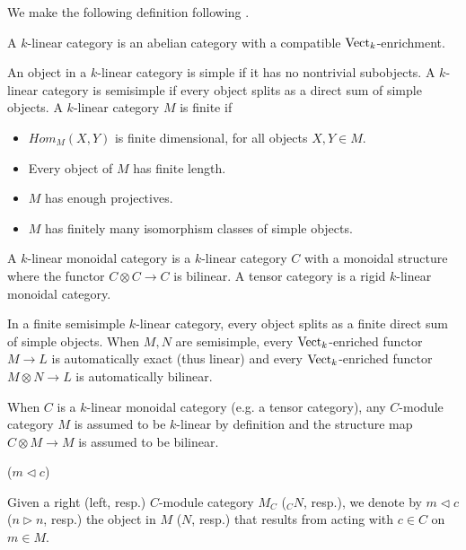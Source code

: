 \noindent We make the following definition following \cite{douglas/balanced-product}.

\begin{definition} A $k$-linear category is an abelian category with a compatible $\operatorname{Vect}_{k}$-enrichment. %
\end{definition}

\begin{definition} \cite{egno/tensor-cats} An object in a $k$-linear category is simple if it has no
  nontrivial subobjects. A $k$-linear category is semisimple if every object
  splits as a direct sum of simple objects. A $k$-linear category $M$ is
  finite if
  \begin{itemize}
    \item $Hom_M(X,Y)$ is finite dimensional, for all objects $X,Y\in M$.
    \item Every object of $M$ has finite length.
    \item $M$ has enough projectives.
    \item $M$ has finitely many isomorphism classes of simple objects.
  \end{itemize}
  A $k$-linear monoidal category is a $k$-linear category $C$ with a monoidal structure where the functor $C\otimes C\to C$ is bilinear.
  A tensor category is a rigid $k$-linear monoidal category.
\end{definition}%

\noindent In a finite semisimple $k$-linear category, every object splits as a
finite direct sum of simple objects. When $M,N$ are semisimple, every
$\operatorname{Vect}_{k}$-enriched functor $M\to L$ is automatically exact (thus linear) and
every $\operatorname{Vect}_{k}$-enriched functor $M\otimes N\to L$ is automatically bilinear.

\begin{assumption}
 When $C$ is a $k$-linear monoidal category (e.g. a tensor category), any $C$-module category $M$ is assumed to be $k$-linear by definition and the structure map $C\otimes M\to M$ is assumed to be bilinear. 
\end{assumption}%

\begin{notation} ($m \lhd c$)

  Given a right (left, resp.) $C$-module category $M_C$ ($_{C}N$, resp.), we denote by $m\lhd c$ ($n \rhd n$, resp.) the object in $M$ ($N$, resp.) that results from acting with $c\in C$ on $m\in M$.
  \end{notation}

